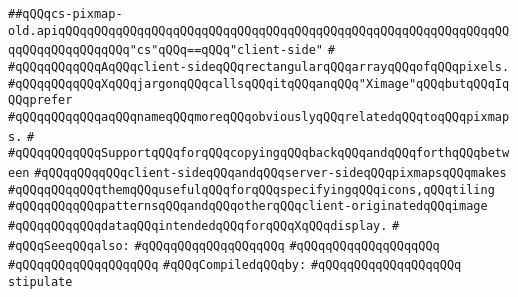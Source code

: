 \label{src/lib/x-kit/xclient/src/window/cs-pixmap-old.api}
\verb|##qQQqcs-pixmap-old.apiqQQqqQQqqQQqqQQqqQQqqQQqqQQqqQQqqQQqqQQqqQQqqQQqqQQqqQQqqQQqqQQqqQQqqQQqqQQqqQQq"cs"qQQq==qQQq"client-side"|\newline
\verb|#|\newline
\verb|#qQQqqQQqqQQqAqQQqclient-sideqQQqrectangularqQQqarrayqQQqofqQQqpixels.|\newline
\verb|#qQQqqQQqqQQqXqQQqjargonqQQqcallsqQQqitqQQqanqQQq"Ximage"qQQqbutqQQqIqQQqprefer|\newline
\verb|#qQQqqQQqqQQqaqQQqnameqQQqmoreqQQqobviouslyqQQqrelatedqQQqtoqQQqpixmaps.|\newline
\verb|#|\newline
\verb|#qQQqqQQqqQQqSupportqQQqforqQQqcopyingqQQqbackqQQqandqQQqforthqQQqbetween|\newline
\verb|#qQQqqQQqqQQqclient-sideqQQqandqQQqserver-sideqQQqpixmapsqQQqmakes|\newline
\verb|#qQQqqQQqqQQqthemqQQqusefulqQQqforqQQqspecifyingqQQqicons,qQQqtiling|\newline
\verb|#qQQqqQQqqQQqpatternsqQQqandqQQqotherqQQqclient-originatedqQQqimage|\newline
\verb|#qQQqqQQqqQQqdataqQQqintendedqQQqforqQQqXqQQqdisplay.|\newline
\verb|#|\newline
\verb|#qQQqSeeqQQqalso:|\newline
\verb|#qQQqqQQqqQQqqQQqqQQq|\newline
\verb|#qQQqqQQqqQQqqQQqqQQq|\newline
\verb|#qQQqqQQqqQQqqQQqqQQq|\newline
\newline
\verb|#qQQqCompiledqQQqby:|\newline
\verb|#qQQqqQQqqQQqqQQqqQQq|\newline
\newline
\newline
\newline
\newline
\verb|stipulate|\newline
